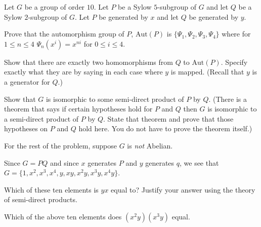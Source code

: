 Let $G$ be a group of order $10$. Let $P$ be a Sylow $5$-subgroup of
$G$ and let $Q$ be a Sylow $2$-subgroup of $G$. Let $P$ be generated
by $x$ and let $Q$ be generated by $y$.
\begin{alist}
\item Prove that the automorphism group of $P$, $\mathrm{Aut}(P)$
is $\{\Psi_1,\Psi_2,\Psi_3,\Psi_4\}$ where for $1\leq n\leq 4$
$\Psi_n(x^i)=x^{ni}$ for $0\leq i\leq 4$.
\item Show that there are exactly two homomorphisms from $Q$ to
$\mathrm{Aut}(P)$. Specify exactly what they are by saying in each
case where $y$ is mapped. (Recall that $y$ is a generator for $Q$.)
\item Show that $G$ is isomorphic to some semi-direct product of $P$
by $Q$. (There is a theorem that says if certain hypotheses hold for
$P$ and $Q$ then $G$ is isomorphic to a semi-direct product of $P$ by
$Q$. State that theorem and prove that those hypotheses on $P$ and $Q$
hold here. You do not have to prove the theorem itself.)
\item For the rest of the problem, suppose $G$ is \emph{not} Abelian.

Since $G=PQ$ and since $x$ generates $P$ and $y$ generates $q$, we
see that $G=\{1,x^2,x^3,x^4,y,xy,x^2y,x^3y,x^4y\}.$

Which of these ten elements is $yx$ equal to? Justify your answer
using the theory of semi-direct products.
\item Which of the above ten elements does $(x^2y)(x^3y)$ equal.
\end{alist}
